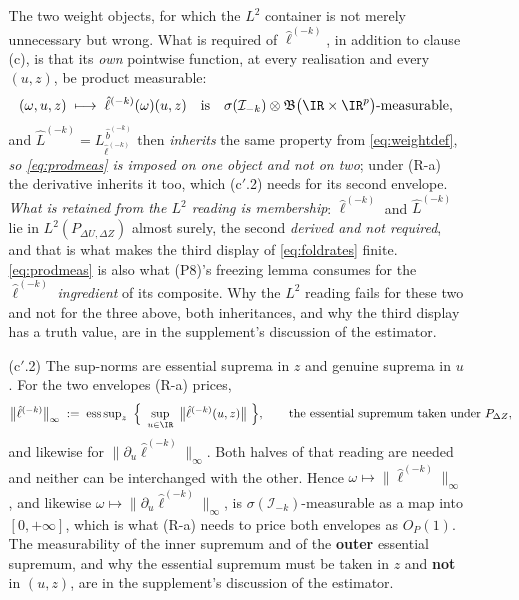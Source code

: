 \begin{definition}
\begin{enumerate}
\begin{enumerate}
The two weight objects, for which the $L^{2}$ container is not merely unnecessary but wrong. What is
required of $\hat\ell^{(-k)}$, in addition to clause \textup{(c)}, is that its \emph{own} pointwise
function, at every realisation and every $(u,z)$, be product measurable:
\begin{equation}\label{eq:prodmeas}
(\omega,u,z)\;\longmapsto\;\hat\ell^{(-k)}(\omega)(u,z)
\quad\text{is}\quad
\sigma(\mathcal I_{-k})\otimes\mathfrak B\big(\IR\times\IR^{p}\big)\text{-measurable} ,
\end{equation}
and $\hat L^{(-k)}=L^{\,\hat b^{(-k)}}_{\hat\ell^{(-k)}}$ then \emph{inherits} the same property from
\eqref{eq:weightdef}, \emph{so \eqref{eq:prodmeas} is imposed on one object and not on two}; under
(R-a) the derivative inherits it too, which \textup{(c$'$.2)} needs for its second envelope.
\emph{What is retained from the $L^{2}$ reading is membership}: $\hat\ell^{(-k)}$ and $\hat L^{(-k)}$
lie in $L^{2}(P_{\Delta U,\Delta Z})$ almost surely, the second \emph{derived and not required}, and
that is what makes the third display of \eqref{eq:foldrates} finite. \eqref{eq:prodmeas} is also what
\textup{(P8)}'s freezing lemma consumes for the $\hat\ell^{(-k)}$ \emph{ingredient} of its composite.
Why the $L^{2}$ reading fails for these two and not for the three above, both inheritances, and why the
third display has a truth value, are in the supplement's discussion of the estimator.
\item[(c$'$.2)] The sup-norms are essential suprema in $z$ and genuine suprema in $u$. For the two
envelopes (R-a) prices,
\begin{equation}\label{eq:supnormconv}
\big\|\hat\ell^{(-k)}\big\|_\infty
\;:=\;\operatorname{ess\,sup}_{z}\ \Big\{\ \sup_{u\in\IR}\ \big\|\hat\ell^{(-k)}(u,z)\big\|\ \Big\} ,
\qquad\text{the essential supremum taken under }P_{\Delta Z},
\end{equation}
and likewise for $\|\partial_u\hat\ell^{(-k)}\|_\infty$. Both halves of that reading are needed and
neither can be interchanged with the other. Hence $\omega\mapsto\|\hat\ell^{(-k)}\|_\infty$, and
likewise $\omega\mapsto\|\partial_u\hat\ell^{(-k)}\|_\infty$, is $\sigma(\mathcal I_{-k})$-measurable as
a map into $[0,+\infty]$, which is what (R-a) needs to price both envelopes as $O_P(1)$. The
measurability of the inner supremum and of the \textbf{outer} essential supremum, and why the essential
supremum must be taken in $z$ and \textbf{not} in $(u,z)$, are in the supplement's discussion of the
estimator.

\end{enumerate}
\end{enumerate}
\end{definition}
